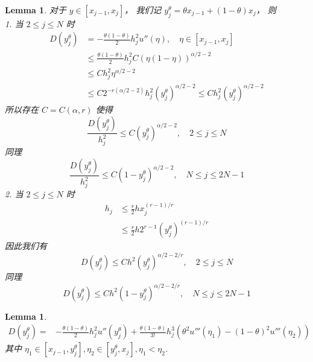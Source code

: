 \documentclass{ctexart}
\newtheorem{lemma}[theorem]{Lemma}
\theoremstyle{definition}
\theoremstyle{remark}
\numberwithin{equation}{section}
\begin{document}
\begin{lemma} \label{lmm:Dyj}
    对于 \(y\in [x_{j-1}, x_j]\)， 我们记 \(y_j^\theta = \theta x_{j-1} + (1-\theta) x_j\)，
    则  \\
    1. 当 \(2\le j \le N\) 时 
    \begin{equation}
        \begin{aligned}
            D(y_j^\theta) &= -\frac{\theta (1-\theta)}{2} h_j^2 u''(\eta), \quad \eta\in [x_{j-1}, x_j] \\
            & \le \frac{\theta (1-\theta)}{2} h_j^2 C  (\eta(1-\eta))^{\alpha/2-2} \\
            & \le C h_j^2 \eta^{\alpha/2-2} \\
            & \le C 2^{-r(\alpha/2-2)}h_j^2 (y_j^\theta)^{\alpha/2-2}
            \le C h_j^2 (y_j^\theta)^{\alpha/2-2}
        \end{aligned}
    \end{equation}
    所以存在 \(C=C(\alpha, r)\) 使得
    \begin{equation}
        \frac{D(y_j^\theta)}{h_j^2} \le C (y_j^\theta)^{\alpha/2-2}, \quad 2 \le j \le N
    \end{equation}
    同理
    \begin{equation}
        \frac{D(y_j^\theta)}{h_j^2} \le C (1-y_j^\theta)^{\alpha/2-2}, \quad N \le j \le 2N-1
    \end{equation}
    2. 当 \(2\le j \le N\) 时
    \begin{equation}
        \begin{aligned}
            h_j &\le \frac{r}{2} h x_j^{(r-1)/r} \\
            & \le \frac{r}{2} h 2^{r-1} (y_j^\theta)^{(r-1)/r}
        \end{aligned}
    \end{equation}
    因此我们有
    \begin{equation}
        D(y_j^\theta) \le C h^2 (y_j^\theta)^{\alpha/2-2/r}, \quad 2 \le j \le N
    \end{equation}
    同理
    \begin{equation}
        D(y_j^\theta) \le C h^2 (1-y_j^\theta)^{\alpha/2-2/r}, \quad N \le j \le 2N-1
    \end{equation}
\end{lemma}




\begin{lemma} \label{lmm:Dyj3}
    \begin{equation}
        \begin{aligned}
            D(y_j^\theta) = & -\frac{\theta (1-\theta)}{2} h_j^2 u''(y_j^\theta)
            + \frac{\theta (1-\theta)}{3!} h_j^3 (\theta^2 u'''(\eta_1) - (1-\theta)^2 u'''(\eta_2))
        \end{aligned}
    \end{equation}
    其中 \(\eta_1 \in [x_{j-1}, y_j^\theta], \eta_2 \in [y_j^\theta, x_j], \eta_1 < \eta_2\).
\end{lemma}
\end{document}
